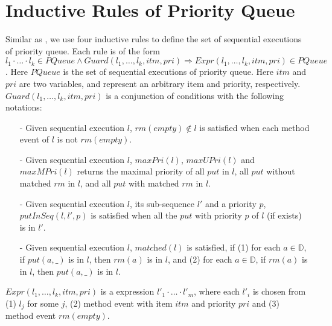 \section{Inductive Rules of Priority Queue}
\label{sec:inductive rules of priority queue}

Similar as \cite{Bouajjani:2015}, we use four inductive rules to define the set of sequential executions of priority queue. Each rule is of the form $l_1 \cdot \ldots \cdot l_k \in \textit{PQueue} \wedge \textit{Guard}(l_1,\ldots,l_k,\textit{itm},\textit{pri}) \Rightarrow \textit{Expr}(l_1,\ldots,l_k,\textit{itm},\textit{pri}) \in \textit{PQueue}$. Here $\textit{PQueue}$ is the set of sequential executions of priority queue. Here $\textit{itm}$ and $\textit{pri}$ are two variables, and represent an arbitrary item and priority, respectively. $\textit{Guard}(l_1,\ldots,l_k,\textit{itm},\textit{pri})$ is a conjunction of conditions with the following notations:

\begin{itemize}
\setlength{\itemsep}{0.5pt}
\item[-] Given sequential execution $l$, $\textit{rm}(\textit{empty}) \notin l$ is satisfied when each method event of $l$ is not $\textit{rm}(\textit{empty})$.

\item[-] Given sequential execution $l$, $\textit{maxPri}(l)$, $\textit{maxUPri}(l)$ and $\textit{maxMPri}(l)$ returns the maximal priority of all $\textit{put}$ in $l$, all $\textit{put}$ without matched $\textit{rm}$ in $l$, and all $\textit{put}$ with matched $\textit{rm}$ in $l$.

\item[-] Given sequential execution $l$, its sub-sequence $l'$ and a priority $p$, $\textit{putInSeq}(l,l',p)$ is satisfied when all the $\textit{put}$ with priority $p$ of $l$ (if exists) is in $l'$.

\item[-] Given sequential execution $l$, $\textit{matched}(l)$ is satisfied, if (1) for each $a \in \mathbb{D}$, if $\textit{put}(a,\_)$ is in $l$, then $\textit{rm}(a)$ is in $l$, and (2) for each $a \in \mathbb{D}$, if $\textit{rm}(a)$ is in $l$, then $\textit{put}(a,\_)$ is in $l$.
\end{itemize}

$\textit{Expr}(l_1,\ldots,l_k,\textit{itm},\textit{pri})$ is a expression $l'_1 \cdot \ldots \cdot l'_m$, where each $l'_i$ is chosen from (1) $l_j$ for some $j$, (2) method event with item $\textit{itm}$ and priority $\textit{pri}$ and (3) method event $\textit{rm}(\textit{empty})$.

